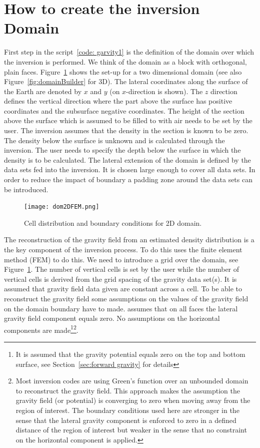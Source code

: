 \section{How to create the inversion Domain}
First step in the script~\ref{code: garvity1} is the definition of the domain over which the inversion is performed.
We think of the domain as a block with orthogonal, plain faces. Figure~\ref{FIG:P1:GRAV:2} shows the set-up for 
a two dimensional domain (see also Figure~\ref{fig:domainBuilder} for 3D). The lateral coordinates along the 
surface of the Earth are denoted by $x$ and $y$ (on $x$-direction is shown). The $z$ direction defines the
vertical direction where the part above the surface has positive coordinates and the 
subsurface negative coordinates. The height of the section above the surface which is assumed to be filled to with air 
needs to be set by the user. The inversion assumes that the density in the section is known to be zero. The density
below the surface is unknown and is calculated through the inversion. The user needs to specify the depth below
the surface in which the density is to be calculated. 
The lateral extension of the domain is defined by the data sets fed into the inversion. It is chosen large enough
to cover all data sets. In order to reduce the impact of boundary a padding zone around the data sets can be introduced.
  
\begin{figure}
\centering
\texttt{[image: dom2DFEM.png]}
\caption{Cell distribution and boundary conditions for 2D domain.}
\label{FIG:P1:GRAV:2}
\end{figure}

The reconstruction of the gravity field from an estimated density distribution is a the key component of the inversion process.
To do this \downunder uses the finite element method (FEM) to do this. We need to introduce a grid over the domain, see Figure~\ref{FIG:P1:GRAV:2}.
The number of vertical cells is set by the user while the number of vertical cells is derived from the grid spacing of the 
gravity data set(s). It is assumed that gravity field data given are constant across a cell. 
To be able to reconstruct the gravity field some assumptions on the values of the gravity field on the domain boundary
have to made. \downunder assumes that on all faces the lateral gravity field component equals 
zero. No assumptions on the 
horizontal components are made\footnote{It is assumed that the gravity potential equals zero on the top and bottom
surface, see Section~\ref{sec:forward gravity} for details}\footnote{Most inversion codes are using Green's function over an unbounded domain to reconstruct the gravity field. This approach
makes the assumption the gravity field (or potential) is converging to zero when moving away from the region of interest. The 
boundary conditions used here are stronger in the sense that the lateral gravity component is enforced to zero in 
a defined distance of the region of interest but weaker in the sense that no constraint on the horizontal component is applied.}.
   
